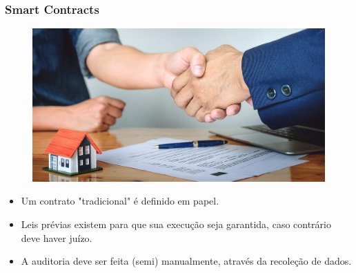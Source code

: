\documentclass[11pt, red]{beamer}
\begin{document}
\begin{frame}
    \frametitle{Smart Contracts}
        \begin{figure}[htb]
            \begin{center}
                \includegraphics[width=0.5\linewidth]{fig/contrato.jpg}
            \end{center}
        \end{figure}
    \begin{beamerboxesrounded}[lower=fundocinza,shadow=true]{}
            \begin{itemize}
            	\item Um contrato "tradicional" \'e definido em papel.
                \item Leis pr\'evias existem para que sua execu\c{c}\~ao seja garantida, caso contr\'ario deve haver ju\'izo.
                \item A auditoria deve ser feita (semi) manualmente, atrav\'es da recole\c{c}\~ao de dados.
            \end{itemize}
    \end{beamerboxesrounded}
\end{frame}
\end{document}
